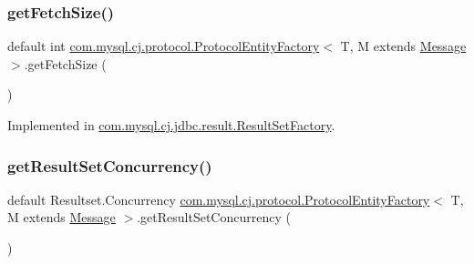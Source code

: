 \mbox{\label{interfacecom_1_1mysql_1_1cj_1_1protocol_1_1_protocol_entity_factory_aa0fc4c08a86fe8f58381439d04389afd}} 
\subsubsection{\texorpdfstring{get\+Fetch\+Size()}{getFetchSize()}}
{\footnotesize\ttfamily default int \mbox{\hyperlink{interfacecom_1_1mysql_1_1cj_1_1protocol_1_1_protocol_entity_factory}{com.\+mysql.\+cj.\+protocol.\+Protocol\+Entity\+Factory}}$<$ T, M extends \mbox{\hyperlink{interfacecom_1_1mysql_1_1cj_1_1protocol_1_1_message}{Message}} $>$.get\+Fetch\+Size (\begin{DoxyParamCaption}{ }\end{DoxyParamCaption})}



Implemented in \mbox{\hyperlink{classcom_1_1mysql_1_1cj_1_1jdbc_1_1result_1_1_result_set_factory_ab49f2c0b4d9ce728f023c3af158cffd9}{com.\+mysql.\+cj.\+jdbc.\+result.\+Result\+Set\+Factory}}.

\mbox{\label{interfacecom_1_1mysql_1_1cj_1_1protocol_1_1_protocol_entity_factory_ab5bf153eafa066fe2d98fd6bd8372972}} 
\subsubsection{\texorpdfstring{get\+Result\+Set\+Concurrency()}{getResultSetConcurrency()}}
{\footnotesize\ttfamily default Resultset.\+Concurrency \mbox{\hyperlink{interfacecom_1_1mysql_1_1cj_1_1protocol_1_1_protocol_entity_factory}{com.\+mysql.\+cj.\+protocol.\+Protocol\+Entity\+Factory}}$<$ T, M extends \mbox{\hyperlink{interfacecom_1_1mysql_1_1cj_1_1protocol_1_1_message}{Message}} $>$.get\+Result\+Set\+Concurrency (\begin{DoxyParamCaption}{ }\end{DoxyParamCaption})}



